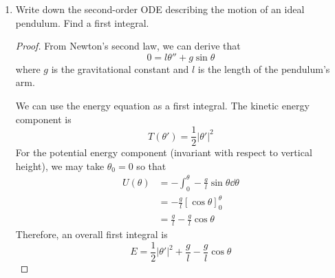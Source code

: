 \documentclass[../psets.tex]{subfiles}
\begin{document}
\begin{enumerate}
\begin{proof}
    \end{proof}
    \item Write down the second-order ODE describing the motion of an ideal pendulum. Find a first integral.
    \begin{proof}
        From Newton's second law, we can derive that
        \begin{equation*}
            0 = l\theta''+g\sin\theta
        \end{equation*}
        where $g$ is the gravitational constant and $l$ is the length of the pendulum's arm.\par
        We can use the energy equation as a first integral. The kinetic energy component is
        \begin{equation*}
            T(\theta') = \frac{1}{2}|\theta'|^2
        \end{equation*}
        For the potential energy component (invariant with respect to vertical height), we may take $\theta_0=0$ so that
        \begin{align*}
            U(\theta) &= -\int_0^\theta -\frac{g}{l}\sin\theta\dd\theta\\
            &= -\frac{g}{l}[\cos\theta]_0^\theta\\
            &= \frac{g}{l}-\frac{g}{l}\cos\theta
        \end{align*}
        Therefore, an overall first integral is
        \begin{equation*}
            E = \frac{1}{2}|\theta'|^2+\frac{g}{l}-\frac{g}{l}\cos\theta
        \end{equation*}
    \end{proof}
\end{enumerate}
\end{document}
